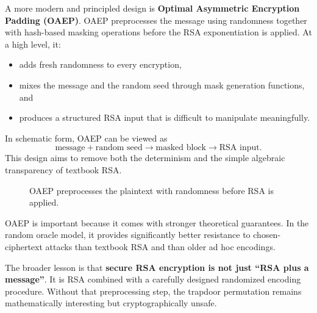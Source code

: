 A more modern and principled design is \textbf{Optimal Asymmetric Encryption Padding (OAEP)}. OAEP preprocesses the message using randomness together with hash-based masking operations before the RSA exponentiation is applied. At a high level, it:

\begin{itemize}
\item adds fresh randomness to every encryption,
\item mixes the message and the random seed through mask generation functions, and
\item produces a structured RSA input that is difficult to manipulate meaningfully.
\end{itemize}

In schematic form, OAEP can be viewed as
\[
\text{message} + \text{random seed}
\longrightarrow
\text{masked block}
\longrightarrow
\text{RSA input}.
\]
This design aims to remove both the determinism and the simple algebraic transparency of textbook RSA.

\begin{figure}[h]
\centering
{}
\caption{OAEP preprocesses the plaintext with randomness before RSA is applied.}
\end{figure}

OAEP is important because it comes with stronger theoretical guarantees. In the random oracle model, it provides significantly better resistance to chosen-ciphertext attacks than textbook RSA and than older ad hoc encodings.

The broader lesson is that \textbf{secure RSA encryption is not just ``RSA plus a message''}. It is RSA combined with a carefully designed randomized encoding procedure. Without that preprocessing step, the trapdoor permutation remains mathematically interesting but cryptographically unsafe.
